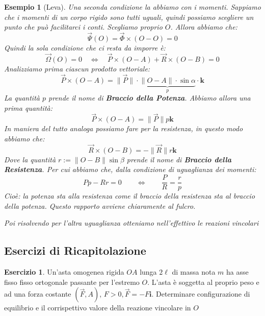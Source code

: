\documentclass[11pt,a4paper,twoside]{article}
\newtheorem{es}{Esempio}
\theoremstyle{definition}
\newtheorem{ese}{Esercizio}[section]
\begin{document}
\begin{es}[Leva]
	Una seconda condizione la abbiamo con i momenti. Sappiamo che i momenti di un corpo rigido sono tutti uguali, quindi possiamo scegliere un punto che può facilitarci i conti. Scegliamo proprio $O$. Allora abbiamo che:
	\[ \vec \Psi(O) = \vec \Phi \times (O-O) = 0 \]
	Quindi la sola condizione che ci resta da imporre è:
	\[ \vec \Omega(O) = 0 \quad \Leftrightarrow \quad \vec P \times (O-A) + \vec R \times (O-B) = 0 \]
	Analizziamo prima ciascun prodotto vettoriale:
	\[ \vec P \times (O-A) = \|\vec P\| \cdot \underbrace{\|O-A\| \cdot \sin \alpha}_{p}\cdot \mathbf k \]
	La quantità $p$ prende il nome di \textbf{Braccio della Potenza}. Abbiamo allora una prima quantità:
	\[ \vec P \times (O-A) = \|\vec P\| p \mathbf k \]
	In maniera del tutto analoga possiamo fare per la resistenza, in questo modo abbiamo che:
	\[ \vec R \times (O-B) = -\|\vec R\| r \mathbf k \]
	Dove la quantità $r:= \|O-B\| \sin \beta$ prende il nome di \textbf{Braccio della Resistenza}.
	Per cui abbiamo che, dalla condizione di uguaglianza dei momenti:
	\[ Pp - Rr = 0 \qquad \Leftrightarrow \qquad \frac PR = \frac rp \]
	Cioè: la potenza sta alla resistenza come il braccio della resistenza sta al braccio della potenza. Questo rapporto avviene chiaramente al fulcro.

	Poi risolvendo per l'altra uguaglianza otteniamo nell'effettivo le reazioni vincolari
\end{es}

\subsection{Esercizi di Ricapitolazione}

\begin{ese}\label{ese1}
	Un'asta omogenea rigida $OA$ lunga $2\ell$ di massa nota $m$ ha asse fisso fisso ortogonale passante per l'estremo $O$. L'asta è soggetta al proprio peso e ad una forza costante $(\vec F, A)$, $F>0, \vec F = -F\mathbf i$. Determinare configurazione di equilibrio e il corrispettivo valore della reazione vincolare in $O$
\end{ese}
\end{document}
